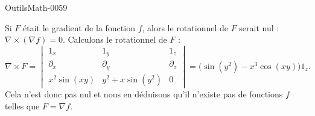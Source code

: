 
\begin{corrige}{OutilsMath-0059}

    Si $F$ était le gradient de la fonction $f$, alors le rotationnel de $F$ serait nul : $\nabla\times(\nabla f)=0$. Calculons le rotationnel de $F$ :
    \begin{equation}
        \nabla\times F=\begin{vmatrix}
           1_x &   1_y    &   1_z    \\
            \partial_x    &   \partial_y    &   \partial_z    \\
            x^2\sin(xy)    &   y^2+x\sin(y^2)    &   0
        \end{vmatrix}=
        \big( \sin(y^2)-x^3\cos(xy) \big)1_z.
    \end{equation}
    Cela n'est donc pas nul et nous en déduisons qu'il n'existe pas de fonctions $f$ telles que $F=\nabla f$.

\end{corrige}
